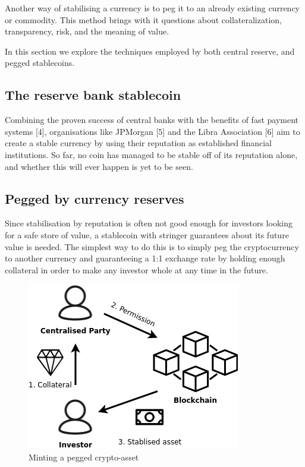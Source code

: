 \documentclass[english,]{IEEEtran}
\begin{document}
Another way of stabilising a currency is to peg it to an already
existing currency or commodity. This method brings with it questions
about collateralization, transparency, risk, and the meaning of value.

In this section we explore the techniques employed by both central
reserve, and pegged stablecoins.

\subsection{The reserve bank
stablecoin}\label{the-reserve-bank-stablecoin}

Combining the proven success of central banks with the benefits of fast
payment systems {[}4{]}, organisations like JPMorgan {[}5{]} and the
Libra Association {[}6{]} aim to create a stable currency by using their
reputation as established financial institutions. So far, no coin has
managed to be stable off of its reputation alone, and whether this will
ever happen is yet to be seen.

\subsection{Pegged by currency
reserves}\label{pegged-by-currency-reserves}

Since stabilisation by reputation is often not good enough for investors
looking for a safe store of value, a stablecoin with stringer guarantees
about its future value is needed. The simplest way to do this is to
simply peg the cryptocurrency to another currency and guaranteeing a 1:1
exchange rate by holding enough collateral in order to make any investor
whole at any time in the future.

\begin{figure}[htbp]
\centering
\includegraphics{img/Centralised_create.png}
\caption{Minting a pegged crypto-asset \label{cent_create_label}}
\end{figure}
\end{document}
